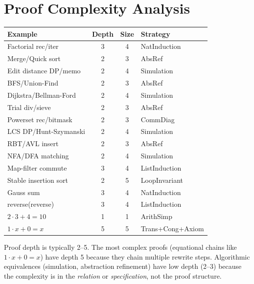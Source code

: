 \section{Proof Complexity Analysis}

\begin{longtable}{lccl}
\toprule
\textbf{Example} & \textbf{Depth} & \textbf{Size} & \textbf{Strategy} \\
\midrule
Factorial rec/iter & 3 & 4 & NatInduction \\
Merge/Quick sort & 2 & 3 & AbsRef \\
Edit distance DP/memo & 2 & 4 & Simulation \\
BFS/Union-Find & 2 & 3 & AbsRef \\
Dijkstra/Bellman-Ford & 2 & 4 & Simulation \\
Trial div/sieve & 2 & 3 & AbsRef \\
Powerset rec/bitmask & 2 & 3 & CommDiag \\
LCS DP/Hunt-Szymanski & 2 & 4 & Simulation \\
RBT/AVL insert & 2 & 3 & AbsRef \\
NFA/DFA matching & 2 & 4 & Simulation \\
Map-filter commute & 3 & 4 & ListInduction \\
Stable insertion sort & 2 & 5 & LoopInvariant \\
Gauss sum & 3 & 4 & NatInduction \\
reverse(reverse) & 3 & 4 & ListInduction \\
$2 \cdot 3 + 4 = 10$ & 1 & 1 & ArithSimp \\
$1 \cdot x + 0 = x$ & 5 & 5 & Trans+Cong+Axiom \\
\bottomrule
\end{longtable}

\begin{remark}
Proof depth is typically 2--5.  The most complex proofs (equational
chains like $1 \cdot x + 0 = x$) have depth 5 because they chain
multiple rewrite steps.  Algorithmic equivalences (simulation, abstraction
refinement) have low depth (2--3) because the complexity is in the
\emph{relation} or \emph{specification}, not the proof structure.
\end{remark}
